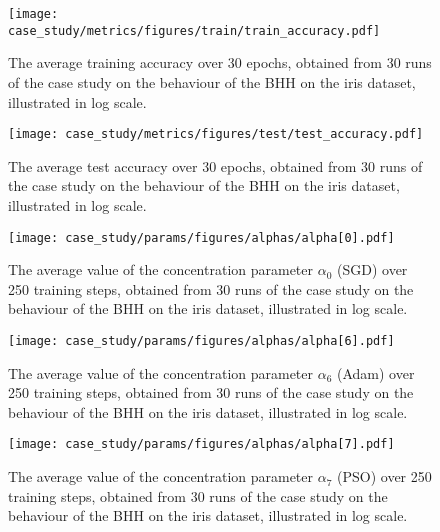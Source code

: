 \begin{figure}[htpb]
	\centering
	\texttt{[image: case\_study/metrics/figures/train/train\_accuracy.pdf]}
	\caption{The average training accuracy over 30 epochs, obtained from 30 runs of the case study on the behaviour of the \acs{BHH} on the iris dataset, illustrated in log scale.}
	\label{fig:results:case_study:train_accuracy}
\end{figure}

\begin{figure}[htpb]
	\centering
	\texttt{[image: case\_study/metrics/figures/test/test\_accuracy.pdf]}
	\caption{The average test accuracy over 30 epochs, obtained from 30 runs of the case study on the behaviour of the \acs{BHH} on the iris dataset, illustrated in log scale.}
	\label{fig:results:case_study:test_accuracy}
\end{figure}




\begin{figure}[htpb]
	\centering
	\texttt{[image: case\_study/params/figures/alphas/alpha[0].pdf]}
	\caption{The average value of the concentration parameter $\alpha_{0}$ (\acs{SGD}) over 250 training steps, obtained from 30 runs of the case study on the behaviour of the \acs{BHH} on the iris dataset, illustrated in log scale.}
	\label{fig:results:case_study:alpha:0}
\end{figure}

\begin{figure}[htpb]
	\centering
	\texttt{[image: case\_study/params/figures/alphas/alpha[6].pdf]}
	\caption{The average value of the concentration parameter $\alpha_{6}$ (\acs{Adam}) over 250 training steps, obtained from 30 runs of the case study on the behaviour of the \acs{BHH} on the iris dataset, illustrated in log scale.}
	\label{fig:results:case_study:alpha:6}
\end{figure}

\begin{figure}[htpb]
	\centering
	\texttt{[image: case\_study/params/figures/alphas/alpha[7].pdf]}
	\caption{The average value of the concentration parameter $\alpha_{7}$ (\acs{PSO}) over 250 training steps, obtained from 30 runs of the case study on the behaviour of the \acs{BHH} on the iris dataset, illustrated in log scale.}
	\label{fig:results:case_study:alpha:7}
\end{figure}

